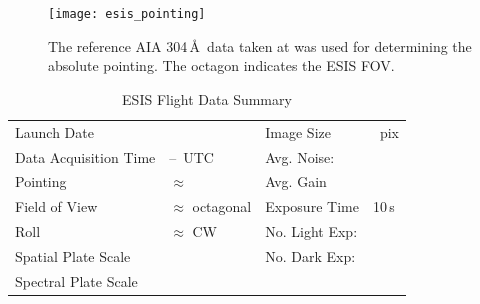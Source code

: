 		
		
		\begin{figure}[ht]
			\begin{center}
				\texttt{[image: esis\_pointing]}
				\caption{The reference AIA 304\,\AA\ data taken at \aianearapogee was used for determining the absolute pointing. The octagon indicates the ESIS FOV.}
				\label{fig:fov}
			\end{center}
		\end{figure}
	

		\begin{table}
		\begin{center}
			\caption{ESIS Flight Data Summary}
			\label{tab:data_info}
			\begin{tabular}{ll|ll}\hline
				Launch Date & \dateMission & Image Size  & \imageShape~pix\\
				Data Acquisition Time & \timeDataStart--\timeDataStop~UTC & Avg. Noise: & \readoutNoise\tablenotemark{a}\\ 
			    Pointing   &  $\approx$ \esispointing & Avg. Gain &   \gain \\
				Field of View  & $\approx$ \esisfov octagonal  & Exposure Time & 10\,s \\
				Roll & $\approx$ \esisroll CW & No. Light Exp: &\numDataFrames\\
			    Spatial  Plate Scale  &  \plateScale & No. Dark Exp: &\numDarkFrames \\
				Spectral  Plate Scale  &  \dispersion & \\
					\hline
			\end{tabular}
		\end{center}
		\end{table}
		
		



	

